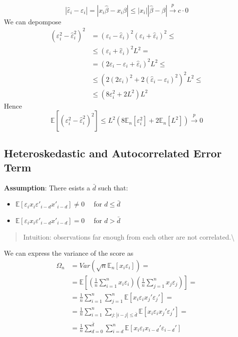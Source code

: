 \documentclass[12pt,]{book}
\providecommand{\tightlist}{%
  \setlength{\itemsep}{0pt}\setlength{\parskip}{0pt}}
\begin{document}
\begin{enumerate}
  \[
       |\hat{\varepsilon}_i - \varepsilon_i| = |x_i \hat \beta - x_i \beta| \leq |x_i||\hat \beta - \beta|\xrightarrow{p} c \cdot 0 
   \]
  We can depompose
  \[
   \begin{aligned}
       \left(\varepsilon_i^2 - \hat{\varepsilon}_i^2 \right)^2 & = \left(\varepsilon_i - \hat{\varepsilon}_i \right)^2 \left(\varepsilon_i + \hat{\varepsilon}_i \right)^2 \leq \\\
       & \leq \left(\varepsilon_i + \hat{\varepsilon}_i \right)^2 L^2 = \\
        &= \left(2\varepsilon_i - \varepsilon_i + \hat{\varepsilon}_i \right)^2 L^2\leq  \\
        & \leq  \left( 2(2\varepsilon_i)^2 + 2(\hat{\varepsilon}_i - \varepsilon_i)^2 \right)^2 L^2 \leq \\
        & \leq (8 \varepsilon_i^2 + 2 L^2) L^2
    \end{aligned}
   \]
  Hence
  \[
    \mathbb E \left[ \left(\varepsilon_i^2 - \hat{\varepsilon}_i^2 \right)^2 \right] \leq  L^2 \left( 8 \mathbb E_n [ \varepsilon_i^2] + 2 \mathbb E_n [L^2] \right)  \xrightarrow{p}0
   \]
  \[\tag*{$\blacksquare$}\]
\end{enumerate}

\hypertarget{heteroskedastic-and-autocorrelated-error-term}{%
\subsection{Heteroskedastic and Autocorrelated Error Term}\label{heteroskedastic-and-autocorrelated-error-term}}

\textbf{Assumption}:
There esists a \(\bar{d}\) such that:

\begin{itemize}
\tightlist
\item
  \(\mathbb E[\varepsilon_i x_i \varepsilon' _ {i-d} x' _ {i-d}] \neq 0 \quad\) for \(d \leq \bar{d}\)
\item
  \(\mathbb E[\varepsilon_i x_i \varepsilon' _ {i-d} x' _ {i-d}] = 0 \quad\) for \(d > \bar{d}\)
\end{itemize}

\begin{quote}
Intuition: observations far enough from each other are not correlated.\textbackslash{}
\end{quote}

We can express the variance of the score as
\[
\begin{aligned}
    \Omega_n &= Var(\sqrt{n} \mathbb E_n[x_i \varepsilon_i]) = \\
    &= \mathbb E \left[ \left( \frac{1}{n} \sum _ {i=1}^n x_i \varepsilon_i \right) \left( \frac{1}{n} \sum _ {j=1}^n x_j \varepsilon_j \right) \right] = \\
    &= \frac{1}{n} \sum _ {i=1}^n \sum _ {j=1}^n \mathbb E[x_i \varepsilon_i x_j' \varepsilon_j'] = \\
    &= \frac{1}{n} \sum _ {i=1}^n \sum _ {j : |i-j|\leq \bar{d}} \mathbb E[x_i \varepsilon_i x_j' \varepsilon_j'] = \\
    &= \frac{1}{n} \sum _ {d=0}^{\bar{d}} \sum _ {i = d}^{n} \mathbb E[x_i \varepsilon_i x _ {i-d}' \varepsilon _ {i-d}'] 
\end{aligned}
\]
\end{document}
